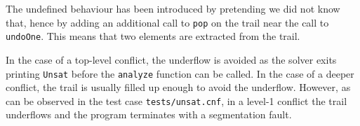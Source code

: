The undefined behaviour has been introduced by pretending we did not know that, hence by adding an additional call to \texttt{pop} on the trail near the call to \texttt{undoOne}. This means that two elements are extracted from the trail.

In the case of a top-level conflict, the underflow is avoided as the solver exits printing \texttt{Unsat} before the \texttt{analyze} function can be called. In the case of a deeper conflict, the trail is usually filled up enough to avoid the underflow. However, as can be observed in the test case \texttt{tests/unsat.cnf}, in a level-1 conflict the trail underflows and the program terminates with a segmentation fault. 
    
